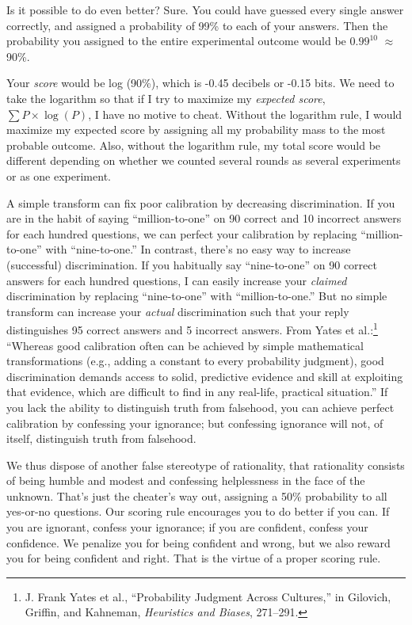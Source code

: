{
 Is it possible to do even better? Sure. You could have guessed
every single answer correctly, and assigned a probability of 99\% to
each of your answers. Then the probability you assigned to the entire
experimental outcome would be $0.99^{10}$ ${\approx}$
90\%.}

{
 Your \textit{score} would be log (90\%), which is -0.45 decibels
or -0.15 bits. We need to take the logarithm so that if I try to
maximize my \textit{expected score}, $\sum P \times \log (P)$, I
have no motive to cheat. Without the logarithm rule, I would maximize
my expected score by assigning all my probability mass to the most
probable outcome. Also, without the logarithm rule, my total score
would be different depending on whether we counted several rounds as
several experiments or as one experiment.}

{
 A simple transform can fix poor calibration by decreasing
discrimination. If you are in the habit of saying
``million-to-one'' on 90 correct and
10 incorrect answers for each hundred questions, we can perfect your
calibration by replacing
``million-to-one'' with
``nine-to-one.'' In contrast,
there's no easy way to increase (successful)
discrimination. If you habitually say
``nine-to-one'' on 90 correct
answers for each hundred questions, I can easily increase your
\textit{claimed} discrimination by replacing
``nine-to-one'' with
``million-to-one.'' But no simple
transform can increase your \textit{actual} discrimination such that
your reply distinguishes 95 correct answers and 5 incorrect answers.
From Yates et al.:\footnote{J. Frank Yates et al., ``Probability Judgment
Across Cultures,'' in Gilovich, Griffin, and
Kahneman, \textit{Heuristics and Biases}, 271--291.} ``Whereas good
calibration often can be achieved by simple mathematical
transformations (e.g., adding a constant to every probability
judgment), good discrimination demands access to solid, predictive
evidence and skill at exploiting that evidence, which are difficult to
find in any real-life, practical situation.'' If you
lack the ability to distinguish truth from falsehood, you can achieve
perfect calibration by confessing your ignorance; but confessing
ignorance will not, of itself, distinguish truth from falsehood.}

{
 We thus dispose of another false stereotype of rationality, that
rationality consists of being humble and modest and confessing
helplessness in the face of the unknown. That's just
the cheater's way out, assigning a 50\% probability to
all yes-or-no questions. Our scoring rule encourages you to do better
if you can. If you are ignorant, confess your ignorance; if you are
confident, confess your confidence. We penalize you for being confident
and wrong, but we also reward you for being confident and right. That
is the virtue of a proper scoring rule.}

